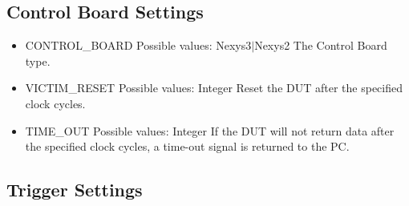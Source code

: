 \subsection{Control Board Settings}
\begin{itemize}
 \item CONTROL\_BOARD \newline
 Possible values: Nexys3$|$Nexys2 \newline
 The Control Board type. 
 \item VICTIM\_RESET \newline
 Possible values: Integer \newline
 Reset the DUT after the specified clock cycles.
 \item TIME\_OUT \newline
 Possible values: Integer \newline
 If the DUT will not return data after the specified clock cycles, a time-out signal is returned to the PC.
\end{itemize}


\subsection{Trigger Settings}

